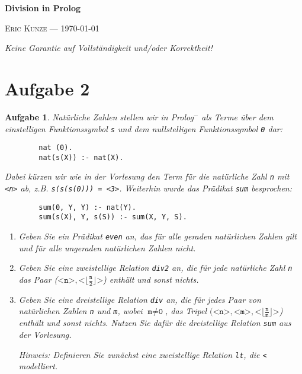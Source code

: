 \documentclass[ngerman, a4paper, 11pt]{article}
\theoremstyle{nonumberplain}
\newtheorem{aufgabe}{Aufgabe}
\newcommand*\ruleline[1]{\par\noindent\raisebox{.8ex}{\makebox[\linewidth]{\hrulefill\hspace{1ex}\raisebox{-.8ex}{#1}\hspace{1ex}\hrulefill}}}
\begin{document}
	\begin{center}
		{\bfseries \sffamily \huge Division in Prolog} 
		
		\ruleline{\sffamily \Large Übungsblatt 8}
		
		{\scshape Eric Kunze --- \today}
	\end{center}
	\medskip
	
	{ \footnotesize \doclicenseThis }
	
	\begin{center}
		\small \slshape Keine Garantie auf Vollständigkeit und/oder Korrektheit!
	\end{center}

\section*{Aufgabe 2}	
	
\begin{aufgabe}
	Natürliche Zahlen stellen wir in Prolog${}^-$ als Terme über dem einstelligen Funktionssymbol \texttt{s}
	und dem nullstelligen Funktionssymbol \texttt{0} dar:
	\begin{lstlisting}
		nat (0).
		nat(s(X)) :- nat(X).
	\end{lstlisting}
	Dabei kürzen wir wie in der Vorlesung den Term für die natürliche Zahl \texttt{n} mit \texttt{<n>} ab, z.B.
	\texttt{s(s(s(0))) = <3>}. Weiterhin wurde das Prädikat \texttt{sum} besprochen:
	\begin{lstlisting}
		sum(0, Y, Y) :- nat(Y).
		sum(s(X), Y, s(S)) :- sum(X, Y, S).
	\end{lstlisting}
	\begin{enumerate}[label=(\alph*)]
		\item Geben Sie ein Prädikat \texttt{even} an, das für alle geraden natürlichen Zahlen gilt und für alle
		ungeraden natürlichen Zahlen nicht.
		\item Geben Sie eine zweistellige Relation \texttt{div2} an, die für jede natürliche Zahl \texttt{n} das Paar
		($\texttt{<n>}, \texttt{<}\lfloor \frac{\texttt{n}}{\texttt{2}} \rfloor \texttt{>}$) enthält und sonst nichts.
		\item Geben Sie eine dreistellige Relation \texttt{div} an, die für jedes Paar von natürlichen Zahlen \texttt{n}
		und \texttt{m}, wobei $\texttt{m} \neq \texttt{0}$, das Tripel $(\texttt{<n>}, \texttt{<m>}, \texttt{<}\lfloor \frac{\texttt{n}}{\texttt{m}} \rfloor \texttt{>}$) enthält und sonst nichts. Nutzen Sie dafür die dreistellige Relation \texttt{sum} aus der Vorlesung.
		
		\textsl{Hinweis:} Definieren Sie zunächst eine zweistellige Relation \texttt{lt}, die \texttt{<} modelliert.
	\end{enumerate}
\end{aufgabe}
\end{document}
